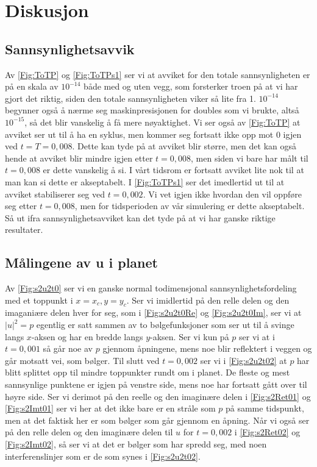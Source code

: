 \documentclass[reprint,english,notitlepage]{revtex4-2}  %
\begin{document}
\section{Diskusjon}
\subsection{Sannsynlighetsavvik}
Av \autoref{Fig:ToTP} og \autoref{Fig:ToTPs1} ser vi at avviket for den totale sannsynligheten er på en skala av $10^{-14}$ både med og uten vegg, som forsterker troen på at vi har gjort det riktig, siden den totale sannsynligheten viker så lite fra 1. $10^{-14}$ begynner også å nærme seg maskinpresisjonen for doubles som vi brukte, altså $10^{-15}$, så det blir vanskelig å få mere nøyaktighet. Vi ser også av \ref{Fig:ToTP} at avviket ser ut til å ha en syklus, men kommer seg fortsatt ikke opp mot 0 igjen ved $t=T=0,008$. Dette kan tyde på at avviket blir større, men det kan også hende at avviket blir mindre igjen etter $t=0,008$, men siden vi bare har målt til $t=0,008$ er dette vanskelig å si. I vårt tidsrom er fortsatt avviket lite nok til at man kan si dette er akseptabelt. I \autoref{Fig:ToTPs1} ser det imedlertid ut til at avviket stabiliserer seg ved $t=0,002$. Vi vet igjen ikke hvordan den vil oppføre seg etter $t=0,008$, men for tidsperioden av vår simulering er dette akseptabelt. Så ut ifra sannsynlighetsavviket kan det tyde på at vi har ganske riktige resultater. 
\subsection{Målingene av u i planet}
Av \autoref{Fig:s2u2t0} ser vi en ganske normal todimensjonal sannsynlighetsfordeling med et toppunkt i $x=x_c, y=y_c$. Ser vi imidlertid på den relle delen og den imaganiære delen hver for seg, som i \autoref{Fig:s2u2t0Re} og \autoref{Fig:s2u2t0Im}, ser vi at $|u|^2=p$ egentlig er satt sammen av to bølgefunksjoner som ser ut til å svinge langs $x$-aksen og har en bredde langs $y$-aksen. Ser vi kun på $p$ ser vi at i $t=0,001$ så går noe av $p$ gjennom åpningene, mens noe blir reflektert i veggen og går motsatt vei, som bølger. Til slutt ved $t=0,002$ ser vi i \autoref{Fig:s2u2t02} at $p$ har blitt splittet opp til mindre toppunkter rundt om i planet. De fleste og mest sannsynlige punktene er igjen på venstre side, mens noe har fortsatt gått over til høyre side.
\newline
Ser vi derimot på den reelle og den imaginære delen i \autoref{Fig:s2Ret01} og \autoref{Fig:s2Imt01} ser vi her at det ikke bare er en stråle som $p$ på samme tidspunkt, men at det faktisk her er som bølger som går gjennom en åpning. Når vi også ser på den relle delen og den imaginære delen til $u$ for $t=0,002$ i \autoref{Fig:s2Ret02} og \autoref{Fig:s2Imt02}, så ser vi at det er bølger som har spredd seg, med noen interferenslinjer som er de som synes i \autoref{Fig:s2u2t02}.
\end{document}
